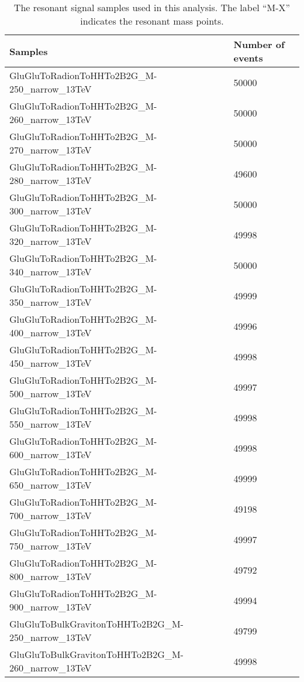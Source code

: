 \begin{table}[h]
\caption{The resonant signal samples used in this analysis. The label ``M-X'' indicates the resonant mass points.}
\centering
\begin{tabular}{ll}
\hline
Samples                                            & Number of events \\ \hline
GluGluToRadionToHHTo2B2G\_M-250\_narrow\_13TeV       & 50000           \\
GluGluToRadionToHHTo2B2G\_M-260\_narrow\_13TeV       & 50000           \\
GluGluToRadionToHHTo2B2G\_M-270\_narrow\_13TeV       & 50000           \\
GluGluToRadionToHHTo2B2G\_M-280\_narrow\_13TeV       & 49600           \\
GluGluToRadionToHHTo2B2G\_M-300\_narrow\_13TeV       & 50000           \\
GluGluToRadionToHHTo2B2G\_M-320\_narrow\_13TeV       & 49998           \\
GluGluToRadionToHHTo2B2G\_M-340\_narrow\_13TeV       & 50000           \\
GluGluToRadionToHHTo2B2G\_M-350\_narrow\_13TeV       & 49999           \\
GluGluToRadionToHHTo2B2G\_M-400\_narrow\_13TeV       & 49996           \\
GluGluToRadionToHHTo2B2G\_M-450\_narrow\_13TeV       & 49998            \\
GluGluToRadionToHHTo2B2G\_M-500\_narrow\_13TeV       & 49997            \\
GluGluToRadionToHHTo2B2G\_M-550\_narrow\_13TeV       & 49998            \\
GluGluToRadionToHHTo2B2G\_M-600\_narrow\_13TeV       & 49998            \\
GluGluToRadionToHHTo2B2G\_M-650\_narrow\_13TeV       & 49999            \\
GluGluToRadionToHHTo2B2G\_M-700\_narrow\_13TeV       & 49198            \\
GluGluToRadionToHHTo2B2G\_M-750\_narrow\_13TeV       & 49997            \\
GluGluToRadionToHHTo2B2G\_M-800\_narrow\_13TeV       & 49792            \\
GluGluToRadionToHHTo2B2G\_M-900\_narrow\_13TeV       & 49994            \\
GluGluToBulkGravitonToHHTo2B2G\_M-250\_narrow\_13TeV & 49799           \\
GluGluToBulkGravitonToHHTo2B2G\_M-260\_narrow\_13TeV & 49998           \\

\end{tabular}
\end{table}
